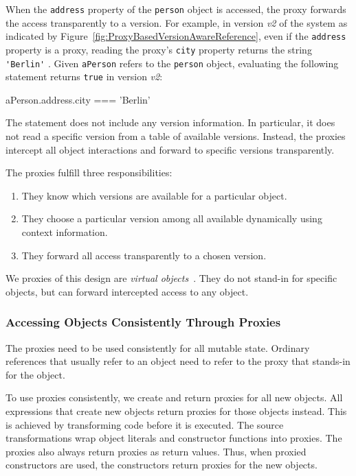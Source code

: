 When the \lstinline{address} property of the \lstinline{person} object is accessed, the proxy forwards the access transparently to a version.
For example, in version \emph{v2} of the system as indicated by Figure~\ref{fig:ProxyBasedVersionAwareReference}, even if the \lstinline{address} property is a proxy, reading the proxy's \lstinline{city} property returns the string \lstinline{'Berlin'} .
Given \lstinline{aPerson} refers to the \lstinline{person} object, evaluating the following statement returns \lstinline{true} in version \emph{v2}:

\begin{code}{}{}
aPerson.address.city === 'Berlin'
\end{code}
\iffalse
\end{verbatim}\fi

The statement does not include any version information.
In particular, it does not read a specific version from a table of available versions.
Instead, the proxies intercept all object interactions and forward to specific versions transparently.

The proxies fulfill three responsibilities:
\begin{enumerate}
    \item They know which versions are available for a particular object.
    \item They choose a particular version among all available dynamically using context information.
    \item They forward all access transparently to a chosen version.
\end{enumerate}

We proxies of this design are \emph{virtual objects}~\cite{VanCutsem2010PDP}.
They do not stand-in for specific objects, but can forward intercepted access to any object.


\subsubsection{Accessing Objects Consistently Through Proxies}

The proxies need to be used consistently for all mutable state.
Ordinary references that usually refer to an object need to refer to the proxy that stands-in for the object.

To use proxies consistently, we create and return proxies for all new objects.
All expressions that create new objects return proxies for those objects instead.
This is achieved by transforming code before it is executed.
The source transformations wrap object literals and constructor functions into proxies.
The proxies also always return proxies as return values.
Thus, when proxied constructors are used, the constructors return proxies for the new objects.

